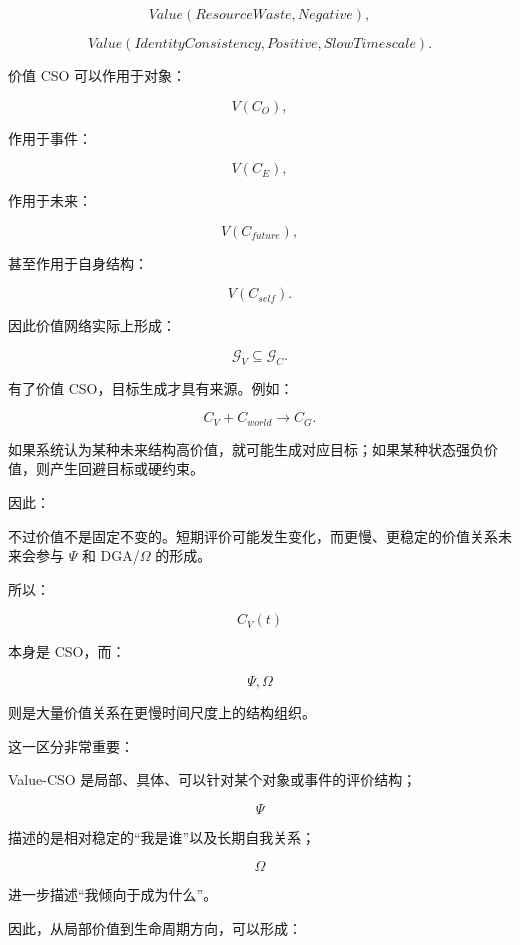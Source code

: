 \[
Value(
ResourceWaste,
Negative
),
\]

\[
Value(
IdentityConsistency,
Positive,
SlowTimescale
).
\]

价值 CSO 可以作用于对象：

\[
V(C_O),
\]

作用于事件：

\[
V(C_E),
\]

作用于未来：

\[
V(C_{future}),
\]

甚至作用于自身结构：

\[
V(C_{self}).
\]

因此价值网络实际上形成：

\[
\boxed{
\mathcal G_V
\subseteq
\mathcal G_C.
}
\]

有了价值 CSO，目标生成才具有来源。例如：

\[
C_V
+
C_{world}
\rightarrow
C_G.
\]

如果系统认为某种未来结构高价值，就可能生成对应目标；如果某种状态强负价值，则产生回避目标或硬约束。

因此：

\begin{statementbox}
\centering
{}
\end{statementbox}

不过价值不是固定不变的。短期评价可能发生变化，而更慢、更稳定的价值关系未来会参与 \(\Psi\) 和 DGA/\(\Omega\) 的形成。

所以：

\[
C_V(t)
\]

本身是 CSO，而：

\[
\Psi,\Omega
\]

则是大量价值关系在更慢时间尺度上的结构组织。

这一区分非常重要：

\begin{statementbox}
\centering
{}
\end{statementbox}

Value-CSO 是局部、具体、可以针对某个对象或事件的评价结构；

\[
\Psi
\]

描述的是相对稳定的“我是谁”以及长期自我关系；

\[
\Omega
\]

进一步描述“我倾向于成为什么”。

因此，从局部价值到生命周期方向，可以形成：

